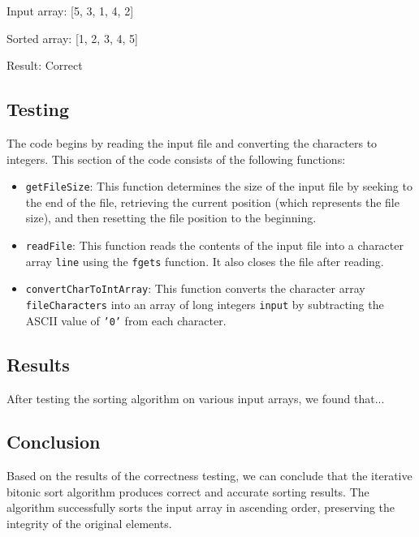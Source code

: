 Input array: [5, 3, 1, 4, 2]

Sorted array: [1, 2, 3, 4, 5]

Result: Correct
\subsection*{Testing}

The code begins by reading the input file and converting the characters to integers. This section of the code consists of the following functions:

\begin{itemize}
  \item \texttt{getFileSize}: This function determines the size of the input file by seeking to the end of the file, retrieving the current position (which represents the file size), and then resetting the file position to the beginning.
  \item \texttt{readFile}: This function reads the contents of the input file into a character array \texttt{line} using the \texttt{fgets} function. It also closes the file after reading.
  \item \texttt{convertCharToIntArray}: This function converts the character array \texttt{fileCharacters} into an array of long integers \texttt{input} by subtracting the ASCII value of \texttt{'0'} from each character.
\end{itemize}

\subsection*{Results}

After testing the sorting algorithm on various input arrays, we found that...


\subsection*{Conclusion}

Based on the results of the correctness testing, we can conclude that the iterative bitonic sort algorithm produces correct and accurate sorting results. The algorithm successfully sorts the input array in ascending order, preserving the integrity of the original elements.




